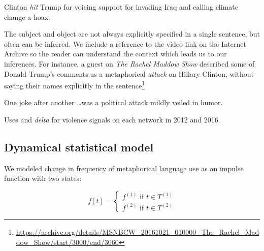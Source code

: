\begin{exe}
  \ex Clinton \emph{hit} Trump for voicing support for invading Iraq and calling
    climate change a hoax.
\end{exe}
The subject and object are not always explicitly
specified in a single sentence, but often can be inferred. We include
a reference to the video link on the Internet Archive so the reader can understand
the context which leads us to our inferences.
For instance, a guest on \emph{The Rachel Maddow Show}
described some of Donald Trump's comments as a metaphorical 
\emph{attack} on Hillary Clinton, without saying their names explicitly in the sentence\footnote{\url{https://archive.org/details/MSNBCW_20161021_010000_The_Rachel_Maddow_Show/start/3000/end/3060}}

\begin{exe}
  \ex One joke after another \ldots was a political attack mildly veiled in
  humor.
\end{exe}

%
\begin{table}[H]
  \centering

  \begin{subtable}{\linewidth}
    \centering
    
    \caption{}
    \label{tab:words-2012}
  \end{subtable}
  
  \vspace{.25in}

  \begin{subtable}{\linewidth}
    \centering
    
    \caption{}
    \label{tab:words-2016}
  \end{subtable}

  \caption{Uses and \emph{delta} for violence signals on each network in 2012 and 2016.}
  \label{tab:words}
\end{table}

\subsection{Dynamical statistical model}

We modeled change in frequency of metaphorical language use as an impulse
function with two states:

\begin{equation} \label{eq:model} 
  f[t] = \begin{cases} f^{(1)} \text{ if } t \in T^{(1)} \\
f^{(2)} \text{ if } t \in T^{(2)} 
  \end{cases} 
\end{equation}
\noindent

